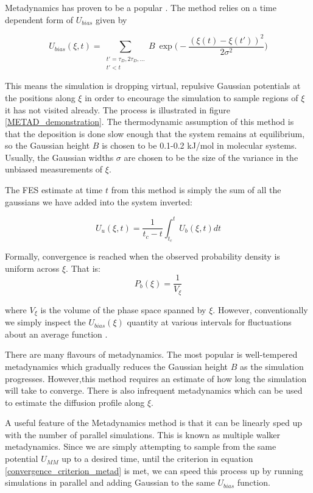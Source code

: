 Metadynamics has proven to be a popular . The method relies on a time dependent form of $U_{bias}$ given by 

\begin{equation}
	U_{bias} (\xi,t) = \sum\limits_{\substack{t' = \tau_D, 2 \tau_D,... \\ t' < t}}  B \ \exp\bigg( - \frac{(\xi(t) - \xi(t') )^2}{2\sigma^2 }\bigg)
\end{equation}

This means the simulation is dropping virtual, repulsive Gaussian potentials at the positions along $\xi$ in order to encourage the simulation to sample regions of $\xi$ it has not visited already. The process is illustrated in figure \ref{METAD_demonstration}. The thermodynamic assumption of this method is that the deposition is done slow enough that the system remains at equilibrium, so the Gaussian height $B$ is chosen to be 0.1-0.2 kJ/mol in molecular systems. Usually, the Gaussian widths $\sigma$ are chosen to be the size of the variance in the unbiased measurements of $\xi$. 

The FES estimate at time $t$ from this method is simply the sum of all the gaussians we have added into the system inverted:  

\begin{equation}
	U_u (\xi,t)  =  \frac{1}{t_c-t} \int_{t_c}^t U_b(\xi,t) dt
\end{equation}

Formally, convergence is reached when the observed probability density is uniform across $\xi$. That is:
\begin{equation}
	P_b (\xi)= \frac{1}{V_\xi } 
	\label{convergence_criterion_metad}
\end{equation}

where $V_\xi$ is the volume of the phase space spanned by $\xi$. However, conventionally we simply inspect the $U_{bias}(\xi)$ quantity at various intervals for fluctuations about an average function \cite{sun2016}. 

There are many flavours of metadynamics. The most popular is well-tempered metadynamics which gradually reduces the Gaussian height $B$ as the simulation progresses\cite{barducci2008}. However,this method requires an estimate of how long the simulation will take to converge. There is also infrequent metadynamics which can be used to estimate the diffusion profile along $\xi$\cite{tiwary2013}\cite{tiwary2016}\cite{salvalaglio2014}.  

A useful feature of the Metadynamics method is that it can be linearly sped up with the number of parallel simulations. This is known as multiple walker metadynamics\cite{raiteri2006}. Since we are simply attempting to sample from the same potential $U_{MM}$ up to a desired time, until the criterion in equation \ref{convergence_criterion_metad} is met, we can speed this process up by running simulations in parallel and adding Gaussian to the same $U_{bias}$ function.

